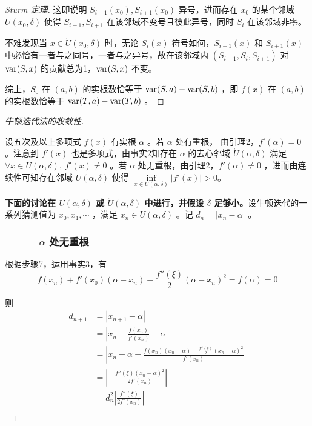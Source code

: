 \begin{proof}[Sturm 定理]
			这即说明 $S_{i - 1}(x_0), S_{i + 1}(x_0)$ 异号，进而存在 $x_0$ 的某个邻域 $U(x_0, \delta)$ 使得 $S_{i - 1}, S_{i + 1}$ 在该邻域不变号且彼此异号，同时 $S_i$ 在该邻域非零。
			
			不难发现当 $x \in \mathring{U}(x_0, \delta)$ 时，无论 $S_i(x)$ 符号如何，$S_{i - 1}(x)$ 和 $S_{i + 1}(x)$ 中必恰有一者与之同号，一者与之异号，故在该邻域内 $(S_{i - 1}, S_i, S_{i + 1})$ 对 $\mathrm{var}(S, x)$ 的贡献总为1，$\mathrm{var}(S, x)$ 不变。
			
		综上，$S_0$ 在 $(a, b)$ 的实根数恰等于 $\mathrm{var}(S, a) - \mathrm{var}(S, b)$ ，即 $f(x)$ 在 $(a, b)$ 的实根数恰等于 $\mathrm{var}(T, a) - \mathrm{var}(T, b)$ 。
		\qedhere
		
		
	\end{proof}

	\begin{proof}[牛顿迭代法的收敛性]~
		
		设五次及以上多项式 $f(x)$ 有实根 $\alpha$ 。若 $\alpha$ 处有重根， 由引理2，$f'(\alpha) = 0$ 。注意到 $f'(x)$ 也是多项式，由事实2知存在 $\alpha$ 的去心邻域 $\mathring{U}(\alpha, \delta)$ 满足 $\forall x \in U(\alpha, \delta), \ f'(x) \neq 0$ 。若 $\alpha$ 处无重根，由引理2，$f'(\alpha) \neq 0$ ，进而由连续性可知存在邻域 $U(\alpha, \delta)$ 使得 $\inf\limits_{x \in U(\alpha, \delta)} |f'(x)| > 0$。
		
		\textbf{下面的讨论在 $U(\alpha, \delta)$ 或 $\mathring{U}(\alpha, \delta)$ 中进行，并假设 $\delta$ 足够小。}设牛顿迭代的一系列猜测值为 $x_0, x_1, \cdots$ ，满足 $x_n \in U(\alpha, \delta)$ 。记 $d_n = |x_n - \alpha|$ 。
		\subsubsection*{\ \ \ \ \ \ $\alpha$ 处无重根}
		根据步骤7，运用事实3，有
		$$	
		f(x_n) + f'(x_0)(\alpha - x_n) + \frac{f''(\xi)}{2} (\alpha - x_n)^2 = f(\alpha) = 0
		$$
		
		则
		$$
		\begin{aligned}
		d_{n + 1} & = \left|x_{n + 1} - \alpha \right| \\
		& = \left|x_n - \frac{f(x_n)}{f'(x_n)} - \alpha\right| \\
		& = \left|x_n - \alpha - \frac{f(x_n)(x_n - \alpha) - \frac{f''(\xi)}{2}(x_n - \alpha)^2}{f'(x_n)} \right| \\
		& = \left|-\frac{f''(\xi)(x_n - \alpha)^2}{2f'(x_n)}\right| \\
		& = d_n^2\left|\frac{f''(\xi)}{2f'(x_n)}\right| \\
		\end{aligned}
		$$
		

\end{proof}
